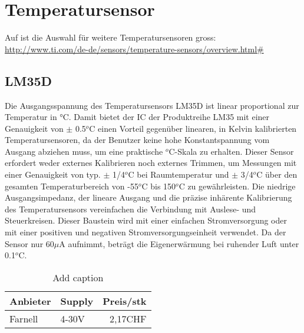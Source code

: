 \section{Temperatursensor}
Auf ist die Auswahl für weitere Temperatursensoren gross:\\
\url{http://www.ti.com/de-de/sensors/temperature-sensors/overview.html#} 
\subsection{LM35D}
Die Ausgangsspannung des Temperatursensors LM35D ist linear proportional zur Temperatur in °C. Damit bietet der IC der Produktreihe LM35 mit einer Genauigkeit von $\pm$ 0.5$^{o}$C einen Vorteil gegenüber linearen, in Kelvin kalibrierten Temperatursensoren, da der Benutzer keine hohe Konstantspannung vom Ausgang abziehen muss, um eine praktische $^{o}$C-Skala zu erhalten. Dieser Sensor erfordert weder externes Kalibrieren noch externes Trimmen, um Messungen mit einer Genauigkeit von typ. $\pm$ 1/4$^{o}$C bei Raumtemperatur und $\pm$ 3/4$^{o}$C über den gesamten Temperaturbereich von -55$^{o}$C bis 150$^{o}$C zu gewährleisten. Die niedrige Ausgangsimpedanz, der lineare Ausgang und die präzise inhärente Kalibrierung des Temperatursensors vereinfachen die Verbindung mit Auslese- und Steuerkreisen. Dieser Baustein wird mit einer einfachen Stromversorgung oder mit einer positiven und negativen Stromversorgungseinheit verwendet. Da der Sensor nur 60$\mu$A aufnimmt, beträgt die Eigenerwärmung bei ruhender Luft unter 0.1$^{o}$C.
\begin{table}[htbp]
  \centering
  \caption{Add caption}
    \begin{tabular}{|l|l|r|}
    \toprule
    \rowcolor[rgb]{ .816,  .808,  .808} Anbieter & Supply & \multicolumn{1}{l|}{Preis/stk} \\
    \midrule
    Farnell & 4-30V & 2,17CHF \\
    \bottomrule
    \end{tabular}%
  \label{tab:addlabel}%
\end{table}%

